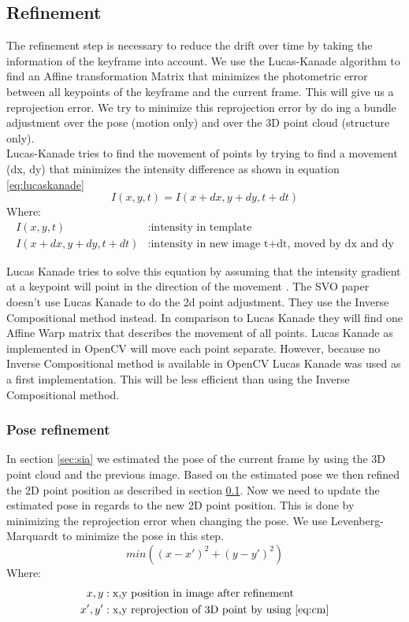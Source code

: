 \documentclass[11pt,a4paper,titlepage,oneside]{report}
\begin{document}
\subsection{Refinement}\label{sec:refinement}

The refinement step is necessary to reduce the drift over time by taking the information of the keyframe into account. We use the Lucas-Kanade algorithm to find an Affine transformation Matrix that minimizes the photometric error between all keypoints of the keyframe and the current frame. This will give us a reprojection error. We try to minimize this reprojection error by do ing a bundle adjustment over the pose (motion only) and over the 3D point cloud (structure only).\\

Lucas-Kanade tries to find the movement of points by trying to find a movement (dx, dy) that minimizes the intensity difference as shown in equation \ref{eq:lucaskanade}
\begin{equation}\label{eq:lucaskanade}
	I(x,y,t)=I(x+dx, y+dy, t+dt)
\end{equation}
Where:
\begin{align*}
	I(x,y,t)						&:	\text{intensity in template}\\
	I(x+dx, y+dy, t+dt) &:	\text{intensity in new image t+dt, moved by dx and dy}
\end{align*}

Lucas Kanade tries to solve this equation by assuming that the intensity gradient at a keypoint will point in the direction of the movement \cite{lucas_kanade}. The SVO paper doesn't use Lucas Kanade to do the 2d point adjustment. They use the Inverse Compositional method instead. In comparison to Lucas Kanade they will find one Affine Warp matrix that describes the movement of all points. Lucas Kanade as implemented in OpenCV will move each point separate. However, because no Inverse Compositional method is available in OpenCV Lucas Kanade was used as a first implementation. This will be less efficient than using the Inverse Compositional method.

\subsubsection{Pose refinement}
In section \ref{sec:sia} we estimated the pose of the current frame by using the 3D point cloud and the previous image. Based on the estimated pose we then refined the 2D point position as described in section \ref{sec:refinement}. Now we need to update the estimated pose in regards to the new 2D point position. This is done by minimizing the reprojection error when changing the pose. We use Levenberg-Marquardt to minimize the pose in this step.
\begin{equation}\label{eq:pose_refinement}
	min((x - x')^2 + (y -y')^2)
\end{equation}
Where:
\begin{align*}
	x,y		&: \text{x,y position in image after refinement}\\
	x',y' &: \text{x,y reprojection of 3D point by using \ref{eq:cm}}
\end{align*}
\end{document}
